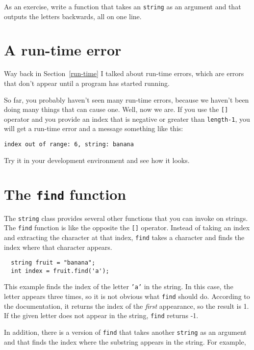As an exercise, write a function that takes an {\tt string}
as an argument and that outputs the letters backwards, all on
one line.

\section{A run-time error}

Way back in Section~\ref{run-time} I talked about run-time errors,
which are errors that don't appear until a program has started
running.

So far, you probably haven't seen many run-time errors, because we
haven't been doing many things that can cause one.  Well, now we are.
If you use the {\tt []} operator and you provide an index that is
negative or greater than {\tt length-1}, you will get a run-time
error and a message something like this:

\begin{lstlisting}
index out of range: 6, string: banana
\end{lstlisting}
%
Try it in your development environment and see how it looks.

\section{The {\tt find} function}

The {\tt string} class provides several other functions that you can
invoke on strings.  The {\tt find} function is like the opposite the
{\tt []} operator.  Instead of taking an index and extracting the
character at that index, {\tt find} takes a character and finds the
index where that character appears.

\begin{lstlisting}
  string fruit = "banana";
  int index = fruit.find('a');
\end{lstlisting}
%
This example finds the index of the letter {\tt 'a'} in the string.
In this case, the letter appears three times, so it is not obvious
what {\tt find} should do.  According to the documentation, it returns
the index of the {\em first} appearance, so the result is 1.  If the
given letter does not appear in the string, {\tt find} returns -1.

In addition, there is a
version of {\tt find} that takes another {\tt string} as
an argument and that finds the index where the substring
appears in the string.  For example,

